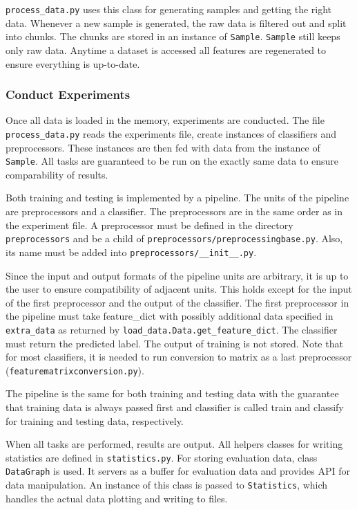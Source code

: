 \texttt{process\_data.py} uses this class for generating samples and getting the right data.
Whenever a new sample is generated, the raw data is filtered out and split into chunks.
The chunks are stored in an instance of \texttt{Sample}.
\texttt{Sample} still keeps only raw data.
Anytime a dataset is accessed all features are regenerated to ensure everything is up-to-date.


\subsubsection{Conduct Experiments}

Once all data is loaded in the memory, experiments are conducted.
The file \texttt{process\_data.py} reads the experiments file, create instances of classifiers and preprocessors.
These instances are then fed with data from the instance of \texttt{Sample}.
All tasks are guaranteed to be run on the exactly same data to ensure comparability of results.

Both training and testing is implemented by a pipeline.
The units of the pipeline are preprocessors and a classifier.
The preprocessors are in the same order as in the experiment file.
A preprocessor must be defined in the directory \texttt{preprocessors} and be a child of \texttt{preprocessors/preprocessingbase.py}.
Also, its name must be added into \texttt{preprocessors/\_\_init\_\_.py}.

Since the input and output formats of the pipeline units are arbitrary,
it is up to the user to ensure compatibility of adjacent units.
This holds except for the input of the first preprocessor and the output of the classifier.
The first preprocessor in the pipeline must take feature\_dict with possibly additional data specified in \texttt{extra\_data} as returned by \texttt{load\_data.Data.get\_feature\_dict}.
The classifier must return the predicted label.
The output of training is not stored.
Note that for most classifiers, it is needed to run conversion to matrix as a last preprocessor (\texttt{featurematrixconversion.py}).

The pipeline is the same for both training and testing data with the guarantee that
training data is always passed first and classifier is called train and classify for
training and testing data, respectively.

When all tasks are performed, results are output.
All helpers classes for writing statistics are defined in \texttt{statistics.py}.
For storing evaluation data, class \texttt{DataGraph} is used.
It servers as a buffer for evaluation data and provides API for data manipulation.
An instance of this class is passed to \texttt{Statistics},
which handles the actual data plotting and writing to files.
